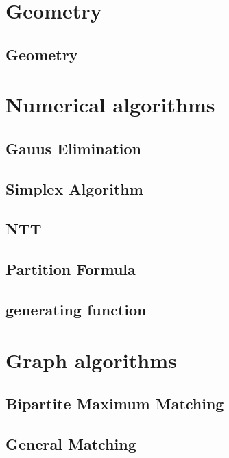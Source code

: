 \section{Geometry}
\subsection{Geometry}
\raggedbottom
\hrulefill

\section{Numerical algorithms}
\subsection{Gauus Elimination}
\raggedbottom
\hrulefill
\subsection{Simplex Algorithm}
\raggedbottom
\hrulefill
\subsection{NTT}
\raggedbottom
\hrulefill
\subsection{Partition Formula}
\raggedbottom
\hrulefill
\subsection{generating function}
\raggedbottom
\hrulefill

\section{Graph algorithms}
\subsection{Bipartite Maximum Matching}
\raggedbottom
\hrulefill
\subsection{General Matching}
\raggedbottom
\hrulefill
